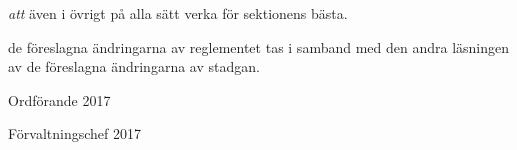 \documentclass[../_main/handlingar.tex]{subfiles}
\begin{document}
\begin{attsatser}
    \emph{att} även i övrigt på alla sätt verka för sektionens bästa.

    \newpage
    \att de föreslagna ändringarna av reglementet tas i samband med den andra läsningen av de föreslagna ändringarna av stadgan.
\end{attsatser}

\begin{signatures}{2}
    \mvh
    \signature{Erik Månsson}{Ordförande 2017}
    \signature{Sophia Grimmeiss Grahm}{Förvaltningschef 2017}
\end{signatures}
\end{document}
